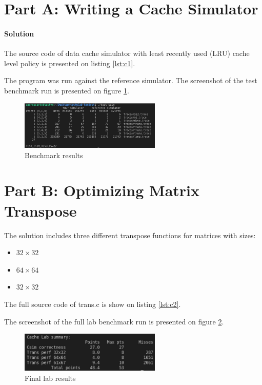 \documentclass{article}
\newcommand\mylstcaption{}
\begin{document}
\section{Part A: Writing a Cache Simulator}
\paragraph{Solution}
The source code of data cache simulator with least recently used (LRU) cache level policy
is presented on listing \ref{lst:c1}.
\renewcommand\mylstcaption{csim.c}
\begin{mdlisting}
  
\end{mdlisting}
The program was run against the reference simulator.
The screenshot of the test benchmark run is presented on figure \ref{fig:test-run}.
\begin{figure}[h]
  \includegraphics[width=0.6\textwidth]{test_results.jpg}
  \centering
  \caption{Benchmark results}
  \label{fig:test-run}
\end{figure}
\section{Part B: Optimizing Matrix Transpose}
The solution includes three different transpose functions for matrices with sizes:
\begin{itemize}
  \item $ 32 \times 32 $
  \item $ 64 \times 64 $
  \item $ 32 \times 32 $
\end{itemize}
The full source code of \textsf{trans.c} is show on listing \ref{lst:c2}.
\renewcommand\mylstcaption{csim.c}
\begin{mdlisting}
  
\end{mdlisting}
The screenshot of the full lab benchmark run is presented on figure \ref{fig:final-run}.
\begin{figure}[h]
  \includegraphics[width=0.6\textwidth]{final_results.jpg}
  \centering
  \caption{Final lab results}
  \label{fig:final-run}
\end{figure}
\end{document}

